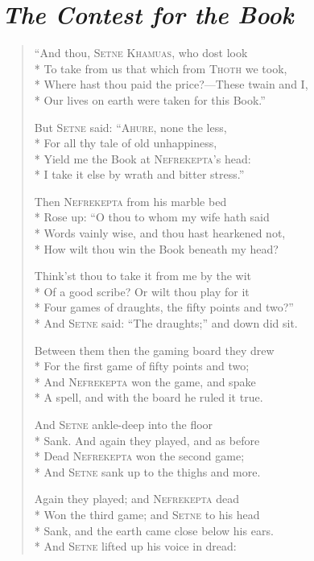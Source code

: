 \documentclass[12pt]{article}
\newcommand{\vin}{\hspace{1em}}
\begin{document}
\section*{\mdseries\itshape The Contest for the Book}

\begin{verse}
``And thou, \textsc{Setne Khamuas}, who dost look\\*
To take from us that which from \textsc{Thoth} we took,\\*
\vin Where hast thou paid the price?---These twain and I,\\*
Our lives on earth were taken for this Book.''

But \textsc{Setne} said: ``\textsc{Ahure}, none the less,\\*
For all thy tale of old unhappiness,\\*
\vin Yield me the Book at \textsc{Nefrekepta}'s head:\\*
I take it else by wrath and bitter stress.''

Then \textsc{Nefrekepta} from his marble bed\\*
Rose up: ``O thou to whom my wife hath said\\*
\vin Words vainly wise, and thou hast hearkened not,\\*
How wilt thou win the Book beneath my head?

Think'st thou to take it from me by the wit\\*
Of a good scribe? Or wilt thou play for it\\*
\vin Four games of draughts, the fifty points and two?''\\*
And \textsc{Setne} said: ``The draughts;'' and down did sit.

Between them then the gaming board they drew\\*
For the first game of fifty points and two;\\*
\vin And \textsc{Nefrekepta} won the game, and spake\\*
A spell, and with the board he ruled it true.

And \textsc{Setne} ankle-deep into the floor\\*
Sank. And again they played, and as before\\*
\vin Dead \textsc{Nefrekepta} won the second game;\\*
And \textsc{Setne} sank up to the thighs and more.

Again they played; and \textsc{Nefrekepta} dead\\*
Won the third game; and \textsc{Setne} to his head\\*
\vin Sank, and the earth came close below his ears.\\*
And \textsc{Setne} lifted up his voice in dread:


\end{verse}
\end{document}
